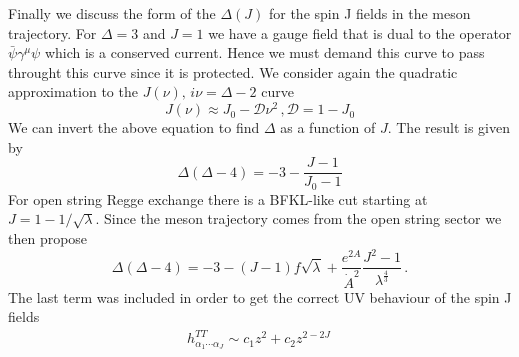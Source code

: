\documentclass[a4paper,12pt]{article}
\begin{document}
Finally we discuss the form of the $\Delta\left(J\right)$ for the spin J fields in the meson trajectory. For $\Delta = 3$ and $J = 1$ we have a gauge field that is dual to the operator $\bar{\psi} \gamma^\mu \psi$ which is a conserved current. Hence we must demand this curve to pass throught this curve since it is protected. We consider again the quadratic approximation to the $J\left(\nu\right), \, i \nu = \Delta - 2$ curve
\begin{equation}
J\left(\nu\right) \approx J_0 - \mathcal{D} \nu^2\, , \mathcal{D} = 1 - J_0
\end{equation}
We can invert the above equation to find $\Delta$ as a function of $J$.  The result is given by
\begin{equation}
\Delta \left( \Delta - 4 \right) = -3 - \frac{J-1}{J_0 - 1}
\end{equation}
For open string Regge exchange there is a BFKL-like cut starting at $J = 1 - 1 / \sqrt{\lambda}$. Since the meson trajectory comes from the open string sector we then propose
\begin{equation}
\Delta \left( \Delta - 4 \right) = - 3 - \left(J - 1 \right) f \sqrt{\lambda}  + \frac{e^{2A}}{\dot{A}^2} \frac{J^2 - 1}{\lambda^{\frac{4}{3}}} \, .
\end{equation}
The last term was included in order to get the correct UV behaviour of the spin J fields
\begin{align}
h^{TT}_{\alpha_1 \cdots \alpha_J} \sim c_1 z^2 + c_2 z^{2- 2J} \,
\end{align}
\end{document}
